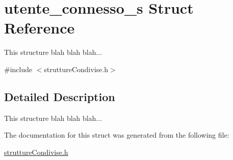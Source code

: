 \hypertarget{structutente__connesso__s}{}\section{utente\+\_\+connesso\+\_\+s Struct Reference}
\label{structutente__connesso__s}


This structure blah blah blah...  




{\ttfamily \#include $<$strutture\+Condivise.\+h$>$}



\subsection{Detailed Description}
This structure blah blah blah... 

The documentation for this struct was generated from the following file\+:\begin{DoxyCompactItemize}
\item 
\hyperlink{struttureCondivise_8h}{strutture\+Condivise.\+h}\end{DoxyCompactItemize}
